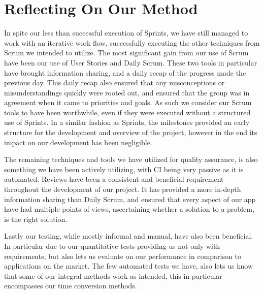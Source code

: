 \section{Reflecting On Our Method}
In spite our less than successful execution of Sprints, we have still managed to work with an iterative work flow, successfully executing the other techniques from Scrum we intended to utilize.
The most significant gain from our use of Scrum have been our use of User Stories and Daily Scrum.
These two tools in particular have brought information sharing, and a daily recap of the progress made the previous day.
This daily recap also ensured that any misconceptions or misunderstandings quickly were rooted out, and ensured that the group was in agreement when it came to priorities and goals.
As such we consider our Scrum tools to have been worthwhile, even if they were executed without a structured use of Sprints.
In a similar fashion as Sprints, the milestones provided an early structure for the development and overview of the project, however in the end its impact on our development has been negligible.

The remaining techniques and tools we have utilized for quality assurance, is also something we have been actively utilizing, with \ac{CI} being very passive as it is automated.
Reviews have been a consistent and beneficial requirement throughout the development of our project.
It has provided a more in-depth information sharing than Daily Scrum, and ensured that every aspect of our app have had multiple points of views, ascertaining whether a solution to a problem, is the right solution.

Lastly our testing, while mostly informal and manual, have also been beneficial.
In particular due to our quantitative tests providing us not only with requirements, but also lets us evaluate on our performance in comparison to applications on the market.
The few automated tests we have, also lets us know that some of our integral methods work as intended, this in particular encompasses our time conversion methods.



